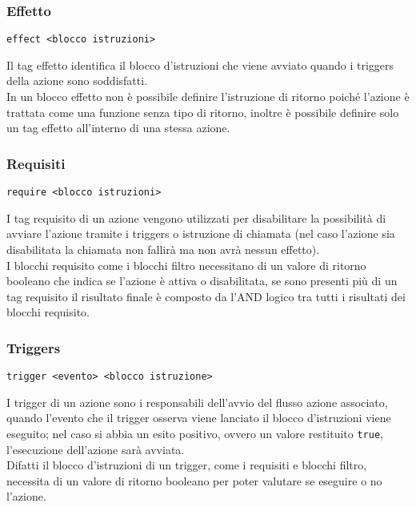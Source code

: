 \subsubsection{Effetto}
\begin{lstlisting}
effect <blocco istruzioni>
\end{lstlisting} 
Il tag effetto identifica il blocco d'istruzioni che viene avviato quando i triggers della azione sono 
soddisfatti. \\
In un blocco effetto non è possibile definire l'istruzione di ritorno poiché l'azione è trattata come 
una funzione senza tipo di ritorno, inoltre è possibile definire solo un tag effetto all'interno 
di una stessa azione.  \\

\subsubsection{Requisiti}
\begin{lstlisting}
require <blocco istruzioni> 
\end{lstlisting}
I tag requisito di un azione vengono utilizzati per disabilitare la possibilità di avviare 
l'azione tramite i triggers o istruzione di chiamata (nel caso l'azione sia 
disabilitata la chiamata non fallirà ma non avrà nessun effetto). \\
I blocchi requisito come i blocchi filtro necessitano di un valore di ritorno booleano che indica 
se l'azione è attiva o disabilitata, se sono presenti più di un tag requisito il risultato finale
è composto da l'AND logico tra tutti i risultati dei blocchi requisito.

\subsubsection{Triggers}
\begin{lstlisting}
trigger <evento> <blocco istruzione>
\end{lstlisting}
I trigger di un azione sono i responsabili dell'avvio del flusso azione associato, 
quando l'evento che il trigger osserva viene lanciato il blocco d'istruzioni viene eseguito; 
nel caso si abbia un esito positivo, ovvero un valore restituito \lstinline|true|, 
l'esecuzione dell'azione sarà avviata. \\
Difatti il blocco d'istruzioni di un trigger, come i requisiti e blocchi filtro, necessita di un 
valore di ritorno booleano per poter valutare se eseguire o no l'azione.


